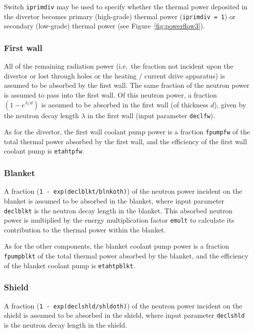 \documentclass[11pt,a4paper]{report}
\begin{document}
Switch \texttt{iprimdiv} may be used to specify whether the thermal power
deposited in the divertor becomes primary (high-grade) thermal power
(\texttt{iprimdiv = 1}) or secondary (low-grade) thermal power (see
Figure~\ref{fig:powerflow3}).

\subsubsection{First wall}

All of the remaining radiation power (i.e.\ the fraction not incident upon the
divertor or lost through holes or the heating / current drive apparatus) is
assumed to be absorbed by the first wall. The same fraction of the neutron
power is assumed to pass into the first wall. Of this neutron power, a
fraction $(1-e^{\lambda/d})$ is assumed to be absorbed in the first wall
(of thickness $d$), given by the neutron decay length $\lambda$ in the first wall
(input parameter \texttt{declfw}).

As for the divertor, the first wall coolant pump power is a fraction
\texttt{fpumpfw} of the total thermal power absorbed by the first wall, and
the efficiency of the first wall coolant pump is \texttt{etahtpfw}.

\subsubsection{Blanket}

A fraction (\texttt{1 - exp(declblkt/blnkoth)}) of the neutron power incident
on the blanket is assumed to be absorbed in the blanket, where input parameter
\texttt{declblkt} is the neutron decay length in the blanket. This absorbed
neutron power is multiplied by the energy multiplication factor \texttt{emult}
to calculate its contribution to the thermal power within the blanket.

As for the other components, the blanket coolant pump power is a fraction
\texttt{fpumpblkt} of the total thermal power absorbed by the blanket, and
the efficiency of the blanket coolant pump is \texttt{etahtpblkt}.

\subsubsection{Shield}

A fraction (\texttt{1 - exp(declshld/shldoth)}) of the neutron power incident
on the shield is assumed to be absorbed in the shield, where input parameter
\texttt{declshld} is the neutron decay length in the shield.
\end{document}
